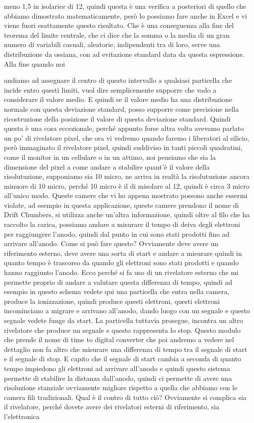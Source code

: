 meno 1,5 in isolarice di 12, quindi questa è una verifica a posteriori di quello che abbiamo dimostrato matematicamente, però lo possiamo fare anche in Excel e vi viene fuori esattamente questo risultato. Che è una conseguenza alla fine del teorema del limite centrale, che ci dice che la somma o la media di un gran numero di variabili casuali, aleatorie, indipendenti tra di loro, serve una distribuzione da ossiana, con ad evitazione standard data da questa espressione. Alla fine quando noi 

andiamo ad assegnare il centro di questo intervallo a qualsiasi particella che incide entro questi limiti, vuol dire semplicemente supporre che vado a considerare il valore medio. E quindi se il valore medio ha una distribuzione normale con questa deviazione standard, posso supporre come precisione nella ricostruzione della posizione il valore di questa deviazione standard. Quindi questa è una cosa eccezionale, perché appunto forse altra volta avevamo parlato un po' di rivelatore pixel, che ora vi vedremo quando faremo i liberatori al silicio, però immaginato il rivelatore pixel, quindi suddiviso in tanti piccoli quadratini, come il monitor in un cellulare o in un attimo, noi pensiamo che sia la dimensione del pixel a come andare a stabilire quant'è il valore della risolutuzione, supponiamo sia 10 micro, ne arriva in realtà la risolutuzione ancora minuore di 10 micro, perché 10 micro è il di misolare al 12, quindi è circa 3 micro all'unico modo. Queste camere che vi ho appena mostrato possono anche essermi violate, ad esempio in questa applicazione, queste camere prendono il nome di Drift Chumbers, si utilizza anche un'altra informazione, quindi oltre al filo che ha raccolto la carica, possiamo andare a misurare il tempo di deiva degli elettroni per raggiungere l'anodo, quindi dal punto in cui sono stati prodotti fino ad arrivare all'anodo. Come si può fare questo? Ovviamente deve avere un riferimento esterno, deve avere una sorta di start e andare a misurare quindi in quanto tempo è trascorso da quando gli elettroni sono stati prodotti e quando hanno raggiunto l'anodo. Ecco perché si fa uso di un rivelatore esterno che mi permette proprio di andare a valutare questa differenza di tempo, quindi ad esempio in questo schema vedete qui una particella che entra nella camera, produce la ionizzazione, quindi produce questi elettroni, questi elettroni incominciano a migrare e arrivano all'anodo, dando luogo con un segnale e questo segnale vedete funge da start. La particella tuttavia prosegue, incontra un altro rivelatore che produce un segnale e questo rappresenta lo stop. Questo modulo che prende il nome di time to digital converter che poi andremo a vedere nel dettaglio non fa altro che misurare una differenza di tempo tra il segnale di start e il segnale di stop. E capito che il segnale di start cambia a seconda di quanto tempo impiedono gli elettroni ad arrivare all'anodo e quindi questo sistema permette di stabilire la distanza dall'anodo, quindi ci permette di avere una risoluzione stanziale ovviamente migliore rispetto a quella che abbiamo con le camera fili tradizionali. Qual è il contro di tutto ciò? Ovviamente si complica sia il rivelatore, perché dovete avere dei rivelatori esterni di riferimento, sia l'elettronica 